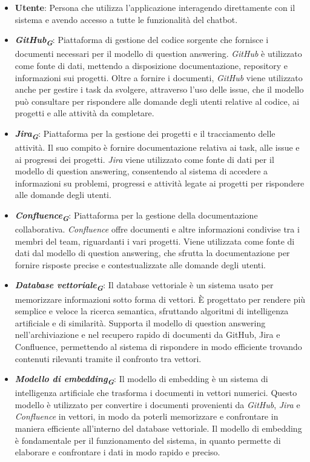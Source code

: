 \begin{itemize}
    \item \textbf{Utente}: Persona che utilizza l'applicazione interagendo direttamente con il sistema e avendo accesso a tutte le funzionalità del chatbot.
    \item \textbf{\emph{GitHub}\textsubscript{\textbf{\textit{G}}}}: Piattaforma di gestione del codice sorgente che fornisce i documenti necessari per il modello di question answering. \emph{GitHub} è utilizzato come fonte di dati, mettendo a disposizione documentazione, repository e informazioni sui progetti. Oltre a fornire i documenti, \emph{GitHub} viene utilizzato anche per gestire i task da svolgere, attraverso l'uso delle issue, che il modello può consultare per rispondere alle domande degli utenti relative al codice, ai progetti e alle attività da completare.
    \item \textbf{\emph{Jira}\textsubscript{\textbf{\textit{G}}}}: Piattaforma per la gestione dei progetti e il tracciamento delle attività. Il suo compito è fornire documentazione relativa ai task, alle issue e ai progressi dei progetti. \emph{Jira} viene utilizzato come fonte di dati per il modello di question answering, consentendo al sistema di accedere a informazioni su problemi, progressi e attività legate ai progetti per rispondere alle domande degli utenti.
    \item \textbf{\emph{Confluence}\textsubscript{\textbf{\textit{G}}}}: Piattaforma per la gestione della documentazione collaborativa. \emph{Confluence} offre documenti e altre informazioni condivise tra i membri del team, riguardanti i vari progetti. Viene utilizzata come fonte di dati dal modello di question answering, che sfrutta la documentazione per fornire risposte precise e contestualizzate alle domande degli utenti.
    \item \textbf{\emph{Database vettoriale}\textsubscript{\textbf{\textit{G}}}}: Il database vettoriale è un sistema usato per memorizzare informazioni sotto forma di vettori. È progettato per rendere più semplice e veloce la ricerca semantica, sfruttando algoritmi di intelligenza artificiale e di similarità. Supporta il modello di question answering nell'archiviazione e nel recupero rapido di documenti da GitHub, Jira e Confluence, permettendo al sistema di rispondere in modo efficiente trovando contenuti rilevanti tramite il confronto tra vettori.
    \item \textbf{\emph{Modello di embedding}\textsubscript{\textbf{\textit{G}}}}: Il modello di embedding è un sistema di intelligenza artificiale che trasforma i documenti in vettori numerici. Questo modello è utilizzato per convertire i documenti provenienti da \emph{GitHub}, \emph{Jira} e \emph{Confluence} in vettori, in modo da poterli memorizzare e confrontare in maniera efficiente all'interno del database vettoriale. Il modello di embedding è fondamentale per il funzionamento del sistema, in quanto permette di elaborare e confrontare i dati in modo rapido e preciso.

\end{itemize}
